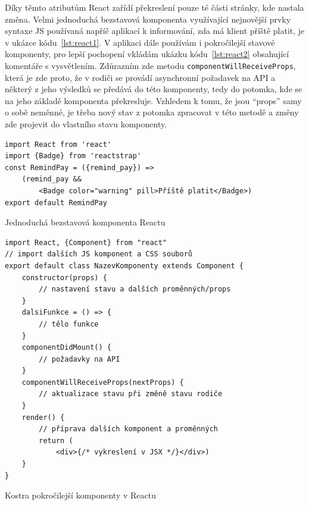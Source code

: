     Díky těmto atributům React zařídí překreslení pouze té části stránky, kde nastala změna. Velmi jednoduchá bezstavová komponenta využívající nejnovější prvky syntaxe JS používaná napříč aplikací k informování, zda má klient příště platit, je v ukázce kódu~\ref{lst:react1}. V aplikaci dále používám i pokročilejší stavové komponenty, pro lepší pochopení vkládám ukázku kódu~\ref{lst:react2} obsahující komentáře s vysvětlením. Zdůrazním zde metodu \verb|componentWillReceiveProps|, která je zde proto, že v rodiči se provádí asynchronní požadavek na API a některý z jeho výsledků se předává do této komponenty, tedy do potomka, kde se na jeho základě komponenta překresluje. Vzhledem k tomu, že jsou \enquote{props} samy o sobě neměnné, je třeba nový stav z potomka zpracovat v této metodě a změny zde projevit do vlastního stavu komponenty.
    
    \begin{listing}
    	\begin{verbatim}
import React from 'react'
import {Badge} from 'reactstrap'
const RemindPay = ({remind_pay}) =>
    (remind_pay && 
        <Badge color="warning" pill>Příště platit</Badge>)
export default RemindPay
    	\end{verbatim}
    	\caption{Jednoduchá bezstavová komponenta Reactu}\label{lst:react1}
    \end{listing}
    
    \begin{listing}[ht]
    	\begin{verbatim}
import React, {Component} from "react"
// import dalších JS komponent a CSS souborů
export default class NazevKomponenty extends Component {
    constructor(props) {
        // nastavení stavu a dalších proměnných/props
    }
    dalsiFunkce = () => {
        // tělo funkce
    }
    componentDidMount() {
        // požadavky na API
    }
    componentWillReceiveProps(nextProps) {
        // aktualizace stavu při změně stavu rodiče
    }
    render() {
        // příprava dalších komponent a proměnných
        return (
            <div>{/* vykreslení v JSX */}</div>)
    }
}
    	\end{verbatim}
    	\caption{Kostra pokročilejší komponenty v Reactu}\label{lst:react2}
    \end{listing}
    

